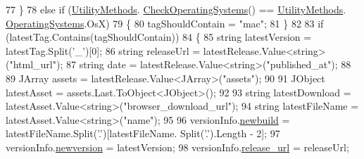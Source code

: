 \begin{DoxyCode}
77                             \}
78                             \textcolor{keywordflow}{else} \textcolor{keywordflow}{if} (\mbox{\hyperlink{class_little_weeb_library_1_1_static_classes_1_1_utility_methods}{UtilityMethods}}.
      \mbox{\hyperlink{class_little_weeb_library_1_1_static_classes_1_1_utility_methods_afc8c716f32bc35d59afdb287be06c3ca}{CheckOperatingSystems}}() == \mbox{\hyperlink{class_little_weeb_library_1_1_static_classes_1_1_utility_methods}{UtilityMethods}}.
      \mbox{\hyperlink{class_little_weeb_library_1_1_static_classes_1_1_utility_methods_aad4a2807f22b8cb65b8db3cdc981a0b1}{OperatingSystems}}.OsX)
79                             \{
80                                 tagShouldContain = \textcolor{stringliteral}{"mac"};
81                             \}
82 
83                             \textcolor{keywordflow}{if} (latestTag.Contains(tagShouldContain))
84                             \{
85                                 \textcolor{keywordtype}{string} latestVersion = latestTag.Split(\textcolor{charliteral}{'\_'})[0];
86                                 \textcolor{keywordtype}{string} releaseUrl = latestRelease.Value<\textcolor{keywordtype}{string}>(\textcolor{stringliteral}{"html\_url"});
87                                 \textcolor{keywordtype}{string} date = latestRelease.Value<\textcolor{keywordtype}{string}>(\textcolor{stringliteral}{"published\_at"});
88 
89                                 JArray assets = latestRelease.Value<JArray>(\textcolor{stringliteral}{"assets"});
90 
91                                 JObject latestAsset = assets.Last.ToObject<JObject>();
92 
93                                 \textcolor{keywordtype}{string} latestDownload = latestAsset.Value<\textcolor{keywordtype}{string}>(\textcolor{stringliteral}{"browser\_download\_url"});
94                                 \textcolor{keywordtype}{string} latestFileName = latestAsset.Value<\textcolor{keywordtype}{string}>(\textcolor{stringliteral}{"name"});
95 
96                                 versionInfo.\mbox{\hyperlink{class_little_weeb_library_1_1_models_1_1_json_version_info_abb2527c1c41e946dd71fe862a48a5f0f}{newbuild}} = latestFileName.Split(\textcolor{charliteral}{'.'})[latestFileName.
      Split(\textcolor{charliteral}{'.'}).Length - 2];
97                                 versionInfo.\mbox{\hyperlink{class_little_weeb_library_1_1_models_1_1_json_version_info_a08d3b36c375a460b440678f84bdb64ee}{newversion}} = latestVersion;
98                                 versionInfo.\mbox{\hyperlink{class_little_weeb_library_1_1_models_1_1_json_version_info_a6ef07d4fd20affb8de244417395e791d}{release\_url}} = releaseUrl;

\end{DoxyCode}
